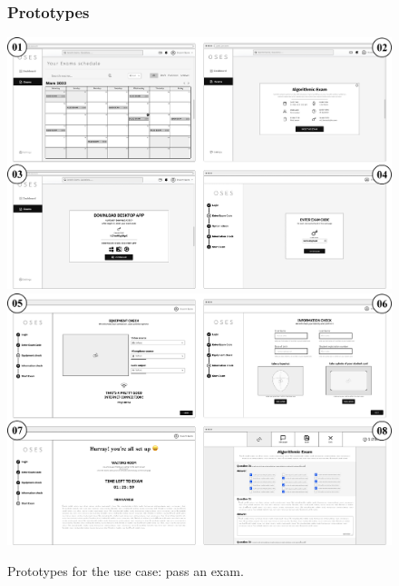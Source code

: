\documentclass[]{uc2pfecaneva}
\begin{document}
    \begin{figure}
        \subsubsection{Prototypes}
        \includegraphics[width=\textwidth]{images/prototypes_pass_exam1}
        \includegraphics[width=\textwidth]{images/prototypes_pass_exam2}
        \caption{Prototypes for the use case: pass an exam.}
    \end{figure}
    \clearpage
\end{document}
